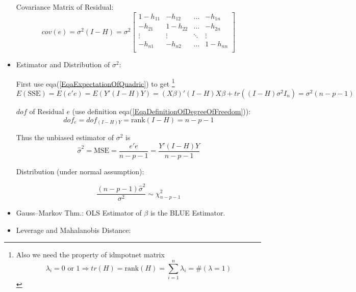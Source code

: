 \begin{itemize}[topsep=2pt,itemsep=2pt]
    Covariance Matrix of Residual:
    \begin{equation}
        cov(e)=\sigma ^2(I-H)=
        \sigma ^2\begin{bmatrix}
        1-h_{11}&-h_{12}&\ldots&-h_{1n}\\
        -h_{21}&1-h_{22}&\ldots&-h_{2n}\\
        \vdots&\vdots&\ddots&\vdots\\
        -h_{n1}&-h_{n2}&\ldots&1-h_{nn}\\
        \end{bmatrix}
    \end{equation}
    
    
    \item Estimator and Distribution of  $ \sigma ^2 $:
    
    First use eqa(\ref{EqaExpectationOfQuadric}) to get \footnote{Also we need the property of idmpotnet matrix
    \begin{equation}
        \lambda_i=0\text{ or }1\Rightarrow tr(H)=\mathrm{rank}(H)=\sum_{i=1}^n\lambda _i=\# (\lambda =1) 
    \end{equation}
    }
    \begin{equation}
        E(\mathrm{SSE})=E(e'e)=E(Y'(I-H)Y)=(X\beta )'(I-H)X\beta +tr((I-H)\sigma ^2I_n) =\sigma ^2(n-p-1)
    \end{equation}

    $ dof $ of Residual $ e $ (use definition eqa(\ref{EqaDefinitionOfDegreeOfFreedom})):
    \begin{equation}
        dof_e=dof_{(I-H)Y}=\mathrm{rank}(I-H)=n-p-1 
    \end{equation}
    
    
    
    Thus the unbiased estimator of $ \sigma ^2 $ is 
    \begin{equation}
        \hat{\sigma }^2=\mathrm{MSE}=\dfrac{e'e}{n-p-1}=\dfrac{Y'(I-H)Y}{n-p-1}
    \end{equation}

    Distribution (under normal assumption):
    
    \begin{equation}
        \dfrac{(n-p-1)\hat{\sigma }^2}{\sigma ^2}\sim \chi^2_{n-p-1}
    \end{equation}
    
    \item Gauss–Markov Thm.: OLS Estimator of $ \beta  $ is the BLUE Estimator.
    \item Leverage and Mahalanobis Distance:
    

\end{itemize}

